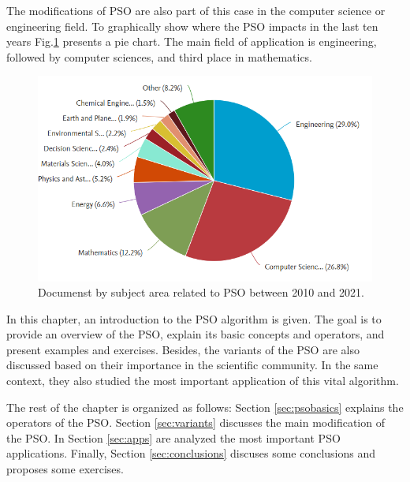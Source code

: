 The modifications of PSO are also part of this case in the computer science or engineering field. To graphically show where the PSO impacts in the last ten years Fig.\ref{fig:PSOarea}  presents a pie chart. The main field of application is engineering, followed by computer sciences, and third place in mathematics.

\begin{figure}[h!]
  \centering
  \includegraphics[scale=0.5]{Images/PSO Area.PNG}
  \caption{Documenst by subject area related to PSO between 2010 and 2021. \label{fig:PSOarea}}
\end{figure}

In this chapter, an introduction to the PSO algorithm is given. The goal is to provide an overview of the PSO, explain its basic concepts and operators, and present examples and exercises. Besides, the variants of the PSO are also discussed based on their importance in the scientific community. In the same context, they also studied the most important application of this vital algorithm.


The rest of the chapter is organized as follows: Section \ref{sec:psobasics} explains the operators of the PSO. Section \ref{sec:variants} discusses the main modification of the PSO. In Section \ref{sec:apps} are analyzed the most important PSO applications. Finally, Section \ref{sec:conclusions} discuses some conclusions and proposes some exercises.


